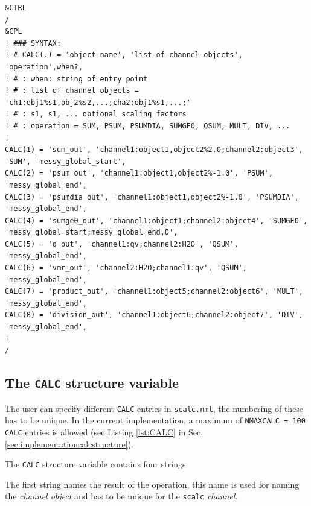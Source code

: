 \documentclass[twoside]{article}
\begin{document}
\begin{lstlisting}[language=FORTRAN,
   breaklines=true, %
   basicstyle=\ttfamily,        % the size of the fonts that are used for the code
   breakatwhitespace=true,         % sets if automatic breaks should only happen at whitespace
   prebreak={\raisebox{0ex}[0ex][0ex]{\space\ensuremath{\boldsymbol{\hookleftarrow}}}},
   commentstyle=\color{gray},
   label={lst:scalc.nml},
   caption = {Example namelist {\tt scalc.nml} of the SCALC submodel. For explanations, see text.}
   ]
&CTRL
/
&CPL
! ### SYNTAX:
! # CALC(.) = 'object-name', 'list-of-channel-objects', 'operation',when?,
! # : when: string of entry point
! # : list of channel objects = 'ch1:obj1%s1,obj2%s2,...;cha2:obj1%s1,...;'
! # : s1, s1, ... optional scaling factors
! # : operation = SUM, PSUM, PSUMDIA, SUMGE0, QSUM, MULT, DIV, ...
!
CALC(1) = 'sum_out', 'channel1:object1,object2%2.0;channel2:object3', 'SUM', 'messy_global_start',
CALC(2) = 'psum_out', 'channel1:object1,object2%-1.0', 'PSUM', 'messy_global_end',
CALC(3) = 'psumdia_out', 'channel1:object1,object2%-1.0', 'PSUMDIA', 'messy_global_end',
CALC(4) = 'sumge0_out', 'channel1:object1;channel2:object4', 'SUMGE0', 'messy_global_start;messy_global_end,0',
CALC(5) = 'q_out', 'channel1:qv;channel2:H2O', 'QSUM', 'messy_global_end',
CALC(6) = 'vmr_out', 'channel2:H2O;channel1:qv', 'QSUM', 'messy_global_end',
CALC(7) = 'product_out', 'channel1:object5;channel2:object6', 'MULT', 'messy_global_end',
CALC(8) = 'division_out', 'channel1:object6;channel2:object7', 'DIV', 'messy_global_end',
!
/
\end{lstlisting}
%
\subsection{The {\tt CALC} structure variable}
\label{sec:calcstructure}
%
The user can specify different {\tt CALC} entries in {\tt scalc.nml}, the numbering of these has to be unique.
In the current implementation, a maximum of {\tt NMAXCALC = 100} {\tt CALC} entries is allowed (see Listing \ref{lst:CALC} in Sec. \ref{sec:implementationcalcstructure}).

The {\tt CALC} structure variable contains four strings:

The first string names the result of the operation, this name is used for naming the {\it channel object} and has to be unique for the {\tt scalc} {\it channel}.
\end{document}
